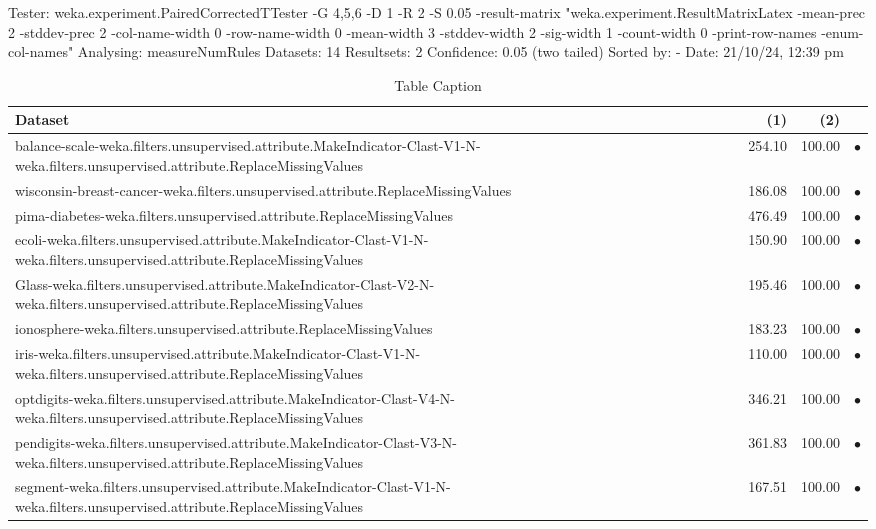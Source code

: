 Tester:     weka.experiment.PairedCorrectedTTester -G 4,5,6 -D 1 -R 2 -S 0.05 -result-matrix "weka.experiment.ResultMatrixLatex -mean-prec 2 -stddev-prec 2 -col-name-width 0 -row-name-width 0 -mean-width 3 -stddev-width 2 -sig-width 1 -count-width 0 -print-row-names -enum-col-names"
Analysing:  measureNumRules
Datasets:   14
Resultsets: 2
Confidence: 0.05 (two tailed)
Sorted by:  -
Date:       21/10/24, 12:39 pm


\begin{table}[thb]
\caption{\label{labelname}Table Caption}
\footnotesize
{\centering \begin{tabular}{lrr@{\hspace{0.1cm}}c}
\\
\hline
Dataset & (1)& (2) & \\
\hline
balance-scale-weka.filters.unsupervised.attribute.MakeIndicator-Clast-V1-N-weka.filters.unsupervised.attribute.ReplaceMissingValues &  254.10 & 100.00 & $\bullet$\\
wisconsin-breast-cancer-weka.filters.unsupervised.attribute.ReplaceMissingValues &  186.08 & 100.00 & $\bullet$\\
pima-diabetes-weka.filters.unsupervised.attribute.ReplaceMissingValues &  476.49 & 100.00 & $\bullet$\\
ecoli-weka.filters.unsupervised.attribute.MakeIndicator-Clast-V1-N-weka.filters.unsupervised.attribute.ReplaceMissingValues &  150.90 & 100.00 & $\bullet$\\
Glass-weka.filters.unsupervised.attribute.MakeIndicator-Clast-V2-N-weka.filters.unsupervised.attribute.ReplaceMissingValues &  195.46 & 100.00 & $\bullet$\\
ionosphere-weka.filters.unsupervised.attribute.ReplaceMissingValues &  183.23 & 100.00 & $\bullet$\\
iris-weka.filters.unsupervised.attribute.MakeIndicator-Clast-V1-N-weka.filters.unsupervised.attribute.ReplaceMissingValues &  110.00 & 100.00 & $\bullet$\\
optdigits-weka.filters.unsupervised.attribute.MakeIndicator-Clast-V4-N-weka.filters.unsupervised.attribute.ReplaceMissingValues &  346.21 & 100.00 & $\bullet$\\
pendigits-weka.filters.unsupervised.attribute.MakeIndicator-Clast-V3-N-weka.filters.unsupervised.attribute.ReplaceMissingValues &  361.83 & 100.00 & $\bullet$\\
segment-weka.filters.unsupervised.attribute.MakeIndicator-Clast-V1-N-weka.filters.unsupervised.attribute.ReplaceMissingValues &  167.51 & 100.00 & $\bullet$\\

\end{tabular}}
\end{table}
